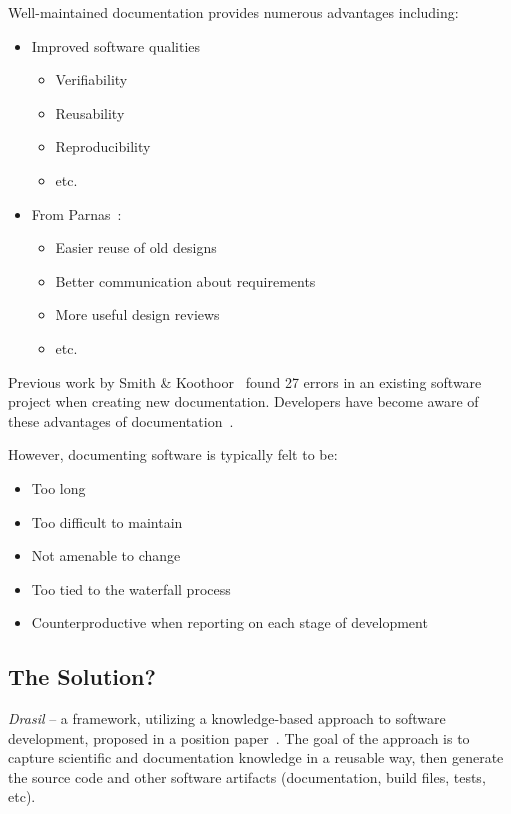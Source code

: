 \documentclass[sigconf]{acmart}
\begin{document}
Well-maintained documentation provides numerous advantages including:
\begin{itemize}
\item Improved software qualities 
	\begin{itemize}
	\item Verifiability
	\item Reusability
	\item Reproducibility
	\item etc.
	\end{itemize}

\item From Parnas~\cite{Parnas2010}:
	\begin{itemize}
		\item Easier reuse of old designs
		\item Better communication about requirements
		\item More useful design reviews
		\item etc.
	\end{itemize}
\end{itemize}

Previous work by Smith \& Koothoor~\citep{SmithAndKoothoor2016} found 27 errors 
in an existing software project when creating new documentation. Developers have 
become aware of these advantages of documentation~\cite{SmithJegatheesanAndKelly2016}.

However, documenting software is typically felt to be:
\begin{itemize}
\item Too long
\item Too difficult to maintain
\item Not amenable to change
\item Too tied to the waterfall process
\item Counterproductive when reporting on each stage of development~\citep{Roache1998}
\end{itemize}

\subsection*{The Solution?}

\textit{Drasil} -- a framework, utilizing a knowledge-based approach to software 
development, proposed in a position paper~\cite{SzymczakEtAl2016}. The goal of 
the approach is to capture scientific and documentation knowledge in a reusable 
way, then generate the source code and other software artifacts (documentation, 
build files, tests, etc).
\end{document}
